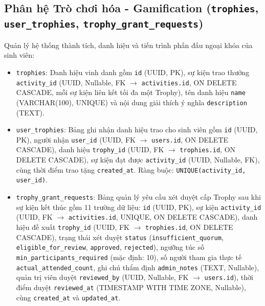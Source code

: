 \subsection{Phân hệ Trò chơi hóa - Gamification (\texttt{trophies}, \texttt{user\_trophies}, \texttt{trophy\_grant\_requests})}
Quản lý hệ thống thành tích, danh hiệu và tiến trình phấn đấu ngoại khóa của sinh viên:
\begin{itemize}[leftmargin=*, noitemsep, topsep=1pt]
    \item \texttt{trophies}: Danh hiệu vinh danh gồm \texttt{id} (UUID, PK), sự kiện trao thưởng \texttt{activity\_id} (UUID, Nullable, FK $\rightarrow$ \texttt{activities.id}, ON DELETE CASCADE, mỗi sự kiện liên kết tối đa một Trophy), tên danh hiệu \texttt{name} (VARCHAR(100), UNIQUE) và nội dung giải thích ý nghĩa \texttt{description} (TEXT).
    \item \texttt{user\_trophies}: Bảng ghi nhận danh hiệu trao cho sinh viên gồm \texttt{id} (UUID, PK), người nhận \texttt{user\_id} (UUID, FK $\rightarrow$ \texttt{users.id}, ON DELETE CASCADE), danh hiệu \texttt{trophy\_id} (UUID, FK $\rightarrow$ \texttt{trophies.id}, ON DELETE CASCADE), sự kiện đạt được \texttt{activity\_id} (UUID, Nullable, FK), cùng thời điểm trao tặng \texttt{created\_at}. Ràng buộc: \texttt{UNIQUE(activity\_id, user\_id)}.
    \item \texttt{trophy\_grant\_requests}: Bảng quản lý yêu cầu xét duyệt cấp Trophy sau khi sự kiện kết thúc gồm 11 trường dữ liệu: \texttt{id} (UUID, PK), sự kiện \texttt{activity\_id} (UUID, FK $\rightarrow$ \texttt{activities.id}, UNIQUE, ON DELETE CASCADE), danh hiệu đề xuất \texttt{trophy\_id} (UUID, FK $\rightarrow$ \texttt{trophies.id}, ON DELETE CASCADE), trạng thái xét duyệt \texttt{status} (\texttt{insufficient\_quorum}, \texttt{eligible\_for\_review}, \texttt{approved}, \texttt{rejected}), ngưỡng túc số \texttt{min\_participants\_required} (mặc định: 10), số người tham gia thực tế \texttt{actual\_attended\_count}, ghi chú thẩm định \texttt{admin\_notes} (TEXT, Nullable), quản trị viên duyệt \texttt{reviewed\_by} (UUID, Nullable, FK $\rightarrow$ \texttt{users.id}), thời điểm duyệt \texttt{reviewed\_at} (TIMESTAMP WITH TIME ZONE, Nullable), cùng \texttt{created\_at} và \texttt{updated\_at}.
\end{itemize}
\endgroup
